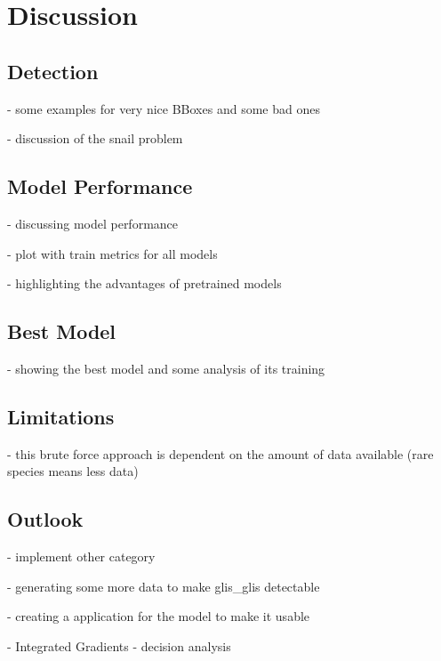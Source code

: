


\section{Discussion}
\label{discussion}

    \subsection{Detection}
    - some examples for very nice BBoxes and some bad ones

    - discussion of the snail problem

    \subsection{Model Performance}
    - discussing model performance

    - plot with train metrics for all models

    - highlighting the advantages of pretrained models

    \subsection{Best Model}
    - showing the best model and some analysis of its training

    \subsection{Limitations}
    - this brute force approach is dependent on the amount of data available (rare species means less data)

    \subsection{Outlook}
    - implement other category

    - generating some more data to make glis\_glis detectable

    - creating a application for the model to make it usable

    - Integrated Gradients - decision analysis